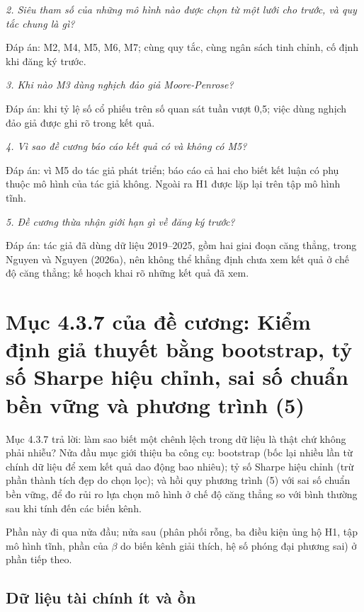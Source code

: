 {\itshape 2. Siêu tham số của những mô hình nào được chọn từ một lưới cho trước, và quy tắc chung là gì?\par}

Đáp án: M2, M4, M5, M6, M7; cùng quy tắc, cùng ngân sách tinh chỉnh, cố định khi đăng ký trước.

{\itshape 3. Khi nào M3 dùng nghịch đảo giả Moore-Penrose?\par}

Đáp án: khi tỷ lệ số cổ phiếu trên số quan sát tuần vượt 0,5; việc dùng nghịch đảo giả được ghi rõ trong kết quả.

{\itshape 4. Vì sao đề cương báo cáo kết quả có và không có M5?\par}

Đáp án: vì M5 do tác giả phát triển; báo cáo cả hai cho biết kết luận có phụ thuộc mô hình của tác giả không. Ngoài ra H1 được lặp lại trên tập mô hình tĩnh.

{\itshape 5. Đề cương thừa nhận giới hạn gì về đăng ký trước?\par}

Đáp án: tác giả đã dùng dữ liệu 2019--2025, gồm hai giai đoạn căng thẳng, trong Nguyen và Nguyen (2026a), nên không thể khẳng định chưa xem kết quả ở chế độ căng thẳng; kế hoạch khai rõ những kết quả đã xem.

\chapter{Mục 4.3.7 của đề cương: Kiểm định giả thuyết bằng bootstrap, tỷ số Sharpe hiệu chỉnh, sai số chuẩn bền vững và phương trình (5)}

Mục 4.3.7 trả lời: làm sao biết một chênh lệch trong dữ liệu là thật chứ không phải nhiễu? Nửa đầu mục giới thiệu ba công cụ: bootstrap (bốc lại nhiều lần từ chính dữ liệu để xem kết quả dao động bao nhiêu); tỷ số Sharpe hiệu chỉnh (trừ phần thành tích đẹp do chọn lọc); và hồi quy phương trình (5) với sai số chuẩn bền vững, để đo rủi ro lựa chọn mô hình ở chế độ căng thẳng so với bình thường sau khi tính đến các biến kênh.

Phần này đi qua nửa đầu; nửa sau (phân phối rỗng, ba điều kiện ủng hộ H1, tập mô hình tĩnh, phần của \texorpdfstring{$\beta$}{beta} do biến kênh giải thích, hệ số phóng đại phương sai) ở phần tiếp theo.

\section{Dữ liệu tài chính ít và ồn}

